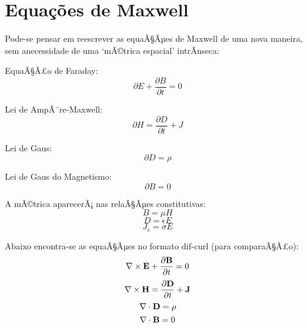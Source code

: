 \section{Equações de Maxwell}
Pode-se pensar em reescrever as equaÃ§Ãµes de Maxwell de uma nova maneira, sem anecessidade de uma `mÃ©trica espacial' intrÃ­nseca:

EquaÃ§Ã£o de Faraday:
$$
\partial E + \frac{\partial{B}}{\partial{t}} = 0
$$

Lei de AmpÃ¨re-Maxwell:
$$
\partial H = \frac{\partial{D}}{\partial{t}} + J
$$

Lei de Gaus:
$$
\partial{D} = \rho
$$

Lei de Gaus do Magnetismo:
$$
\partial{B} = 0
$$

A mÃ©trica aparecerÃ¡ nas relaÃ§Ãµes constitutivas:
$$
B=\mu H
$$
$$
D = \epsilon E
$$
$$
J_c=\sigma E
$$



Abaixo encontra-se as equaÃ§Ãµes no formato dif-curl (para comparaÃ§Ã£o):
$$
\nabla\times\textbf E + \frac{\partial\textbf B}{\partial t} = 0
$$
$$
\nabla\times\textbf H = \frac{\partial\textbf D}{\partial t} + \textbf J
$$
$$
\nabla\cdot\textbf D = \rho
$$
$$
\nabla\cdot\textbf B = 0
$$